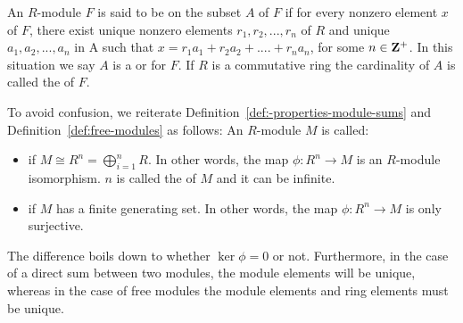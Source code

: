     \begin{definition}\label{def:free-modules}
        An $R$-module $F$ is said to be  on the subset $A$ of $F$ if for every nonzero element $x$ of $F$, there exist unique nonzero elements $r_1,r_2,...,r_n$ of $R$ and unique $a_1,a_2,...,a_n$ in A such that $x = r_1 a_1 + r_2 a_2 + .... + r_n a_n$, for some $n \in \mathbf{Z}^{+}$. In this situation we say $A$ is a  or  for $F$. If $R$ is a commutative ring the cardinality of $A$ is called the  of $F$.
    \end{definition}

    \begin{note}
        To avoid confusion, we reiterate Definition~\ref{def:-properties-module-sums} and Definition~\ref{def:free-modules} as follows: An $R$-module $M$ is called:
        \begin{itemize}
            \item {} if $M \cong R^n = \bigoplus_{i=1}^{n} R$. In other words, the map $\phi:R^n \rightarrow M$ is an $R$-module isomorphism. $n$ is called the  of $M$ and it can be infinite.
            \item {} if $M$ has a finite generating set. In other words, the map $\phi:R^n \rightarrow M$ is only surjective.
        \end{itemize}
        The difference boils down to whether $\ker{\phi}=0$ or not. Furthermore, in the case of a direct sum between two modules, the module elements will be unique, whereas in the case of free modules the module elements and ring elements must be unique.
    \end{note}
    
